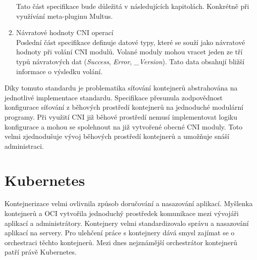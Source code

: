 \begin{enumerate}
    Tato část specifikace bude důležitá v následujících kapitolách. Konkrétně při využívání meta-pluginu Multus.
    \item Návratové hodnoty CNI operací\\
    Poslední část specifikace definuje datové typy, které se souží jako návratové hodnoty při volání CNI modulů. Volané moduly mohou vracet jeden ze tří typů návratových dat (\textit{Success}, \textit{Error}, \textit{\_Version}). Tato data obsahují bližší informace o výsledku volání.  
\end{enumerate}

Díky tomuto standardu je problematika síťování kontejnerů abstrahována na jednotlivé implementace standardu. Specifikace přesunula zodpovědnost konfigurace síťování z běhových prostředí kontejnerů na jednoduché modulární programy. Při využití CNI již běhové prostředí nemusí implementovat logiku konfigurace a mohou se spolehnout na již vytvořené obecné CNI moduly. Toto velmi zjednodušuje vývoj běhových prostředí kontejnerů a umožňuje snáší administraci. \cite{containernetworking_2022_container}
\section{Kubernetes}
Kontejnerizace velmi ovlivnila způsob doručování a nasazování aplikací. Myšlenka kontejnerů a OCI vytvořila jednoduchý prostředek komunikace mezi vývojáři aplikací a administrátory. Kontejnery velmi standardizovalo správu a nasazování aplikací na servery. Pro ulehčení práce s kontejnery dává smysl zajímat se o orchestraci těchto kontejnerů. Mezi dnes nejznámější orchestrátor kontejnerů patří právě Kubernetes. \cite{goldberg_2019_workflow}



